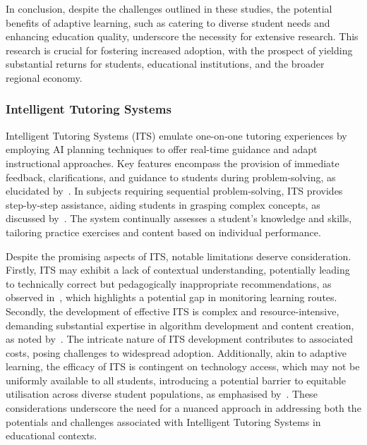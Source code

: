 In conclusion, despite the challenges outlined in these studies, the potential benefits of adaptive learning, such as catering to diverse student needs and enhancing education quality, underscore the necessity for extensive research. This research is crucial for fostering increased adoption, with the prospect of yielding substantial returns for students, educational institutions, and the broader regional economy.

\subsubsection{Intelligent Tutoring Systems}Intelligent Tutoring Systems (ITS) emulate one-on-one tutoring experiences by employing AI planning techniques to offer real-time guidance and adapt instructional approaches. Key features encompass the provision of immediate feedback, clarifications, and guidance to students during problem-solving, as elucidated by~\citet{Corbett1997}. In subjects requiring sequential problem-solving, ITS provides step-by-step assistance, aiding students in grasping complex concepts, as discussed by~\citet{burns2013intelligent}. The system continually assesses a student's knowledge and skills, tailoring practice exercises and content based on individual performance.

Despite the promising aspects of ITS, notable limitations deserve consideration. Firstly, ITS may exhibit a lack of contextual understanding, potentially leading to technically correct but pedagogically inappropriate recommendations, as observed in~\citet{Garrido2009}, which highlights a potential gap in monitoring learning routes. Secondly, the development of effective ITS is complex and resource-intensive, demanding substantial expertise in algorithm development and content creation, as noted by~\citet{Corbett1997}. The intricate nature of ITS development contributes to associated costs, posing challenges to widespread adoption. Additionally, akin to adaptive learning, the efficacy of ITS is contingent on technology access, which may not be uniformly available to all students, introducing a potential barrier to equitable utilisation across diverse student populations, as emphasised by~\citet{Kabudi2021}. These considerations underscore the need for a nuanced approach in addressing both the potentials and challenges associated with Intelligent Tutoring Systems in educational contexts.

